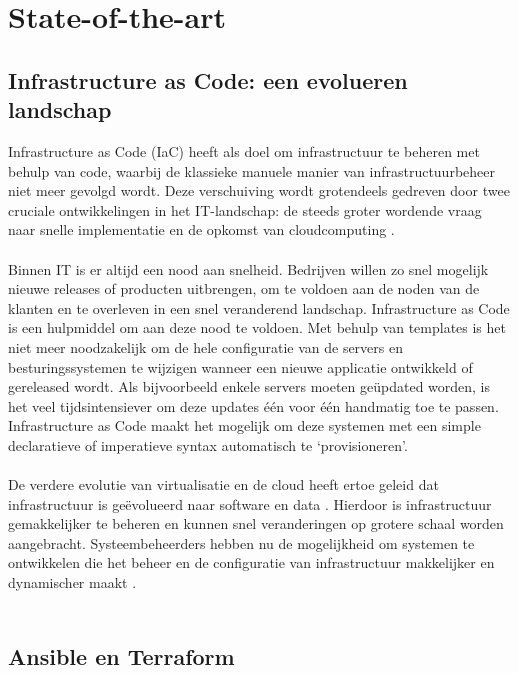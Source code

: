 \section{State-of-the-art}%
\label{sec:state-of-the-art}

\subsection{Infrastructure as Code: een evolueren landschap}

Infrastructure as Code (IaC) heeft als doel om infrastructuur te beheren met behulp van code, waarbij de klassieke manuele manier van infrastructuurbeheer niet meer gevolgd wordt. Deze verschuiving wordt grotendeels gedreven door twee cruciale ontwikkelingen in het IT-landschap: de steeds groter wordende vraag naar snelle implementatie en de opkomst van cloudcomputing \autocite{Guerriero_2019}. \\\\

Binnen IT is er altijd een nood aan snelheid. Bedrijven willen zo snel mogelijk nieuwe releases of producten uitbrengen, om te voldoen aan de noden van de klanten en te overleven in een snel veranderend landschap. Infrastructure as Code is een hulpmiddel om aan deze nood te voldoen. Met behulp van templates is het niet meer noodzakelijk om de hele configuratie van de servers en besturingssystemen te wijzigen wanneer een nieuwe applicatie ontwikkeld of gereleased wordt. Als bijvoorbeeld enkele servers moeten geüpdated worden, is het veel tijdsintensiever om deze updates één voor één handmatig toe te passen. Infrastructure as Code maakt het mogelijk om deze systemen met een simple declaratieve of imperatieve syntax automatisch te ‘provisioneren’. \\\\

De verdere evolutie van virtualisatie en de cloud heeft ertoe geleid dat infrastructuur is geëvolueerd  naar software en data \autocite{Guerriero_2019}. Hierdoor is infrastructuur gemakkelijker te beheren en kunnen snel veranderingen op grotere schaal worden aangebracht. Systeembeheerders hebben nu de mogelijkheid om systemen te ontwikkelen die het beheer en de configuratie van infrastructuur makkelijker en dynamischer maakt \autocite{Johann_2017}. \\\\

\subsection{Ansible en Terraform}

